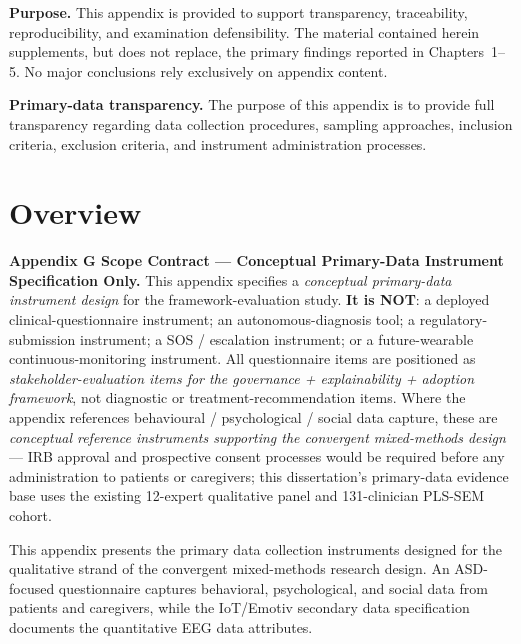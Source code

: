 

\noindent\textbf{Purpose.} This appendix is provided to support transparency, traceability, reproducibility, and examination defensibility. The material contained herein supplements, but does not replace, the primary findings reported in Chapters~1--5. No major conclusions rely exclusively on appendix content.


\noindent\textbf{Primary-data transparency.} The purpose of this appendix is to provide full transparency regarding data collection procedures, sampling approaches, inclusion criteria, exclusion criteria, and instrument administration processes.


\normalsize\normalfont\color{black}

\section*{Overview}

\noindent\textbf{Appendix G Scope Contract --- Conceptual Primary-Data Instrument Specification Only.}
\label{para:appg_scope_contract}
This appendix specifies a \emph{conceptual primary-data instrument design} for the framework-evaluation study. \textbf{It is NOT}: a deployed clinical-questionnaire instrument; an autonomous-diagnosis tool; a regulatory-submission instrument; a SOS / escalation instrument; or a future-wearable continuous-monitoring instrument. All questionnaire items are positioned as \emph{stakeholder-evaluation items for the governance + explainability + adoption framework}, not diagnostic or treatment-recommendation items. Where the appendix references behavioural / psychological / social data capture, these are \emph{conceptual reference instruments supporting the convergent mixed-methods design} --- IRB approval and prospective consent processes would be required before any administration to patients or caregivers; this dissertation's primary-data evidence base uses the existing 12-expert qualitative panel and 131-clinician PLS-SEM cohort.

This appendix presents the primary data collection instruments designed for
the qualitative strand of the convergent mixed-methods research design.
An ASD-focused questionnaire captures behavioral, psychological,
and social data from patients and caregivers, while the IoT/Emotiv
secondary data specification documents the quantitative EEG data attributes.

